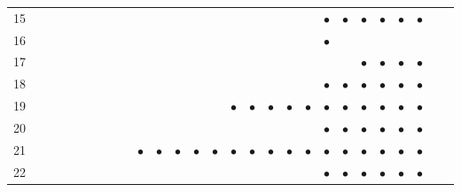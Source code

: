 \documentclass[text.tex]{subfiles}
\begin{document}
\begin{table}
{\begin{tabular}{l|cccccccccccccccccccccccccc}
15  &           &           &           &           &           &           &           &           &           &           &           &           &           &           &           &           &           &           & $\bullet$ & $\bullet$ & $\bullet$ & $\bullet$ & $\bullet$ & $\bullet$ &           \\
16  &           &           &           &           &           &           &           &           &           &           &           &           &           &           &           &           &           &           & $\bullet$ &           &           &           &           &           &           \\
17  &           &           &           &           &           &           &           &           &           &           &           &           &           &           &           &           &           &           &           &           & $\bullet$ & $\bullet$ & $\bullet$ & $\bullet$ &           \\
18  &           &           &           &           &           &           &           &           &           &           &           &           &           &           &           &           &           &           & $\bullet$ & $\bullet$ & $\bullet$ & $\bullet$ & $\bullet$ & $\bullet$ &           \\
19  &           &           &           &           &           &           &           &           &           &           &           &           &           & $\bullet$ & $\bullet$ & $\bullet$ & $\bullet$ & $\bullet$ & $\bullet$ & $\bullet$ & $\bullet$ & $\bullet$ & $\bullet$ & $\bullet$ &           \\
20  &           &           &           &           &           &           &           &           &           &           &           &           &           &           &           &           &           &           & $\bullet$ & $\bullet$ & $\bullet$ & $\bullet$ & $\bullet$ & $\bullet$ &           \\
21  &           &           &           &           &           &           &           &           & $\bullet$ & $\bullet$ & $\bullet$ & $\bullet$ & $\bullet$ & $\bullet$ & $\bullet$ & $\bullet$ & $\bullet$ & $\bullet$ & $\bullet$ & $\bullet$ & $\bullet$ & $\bullet$ & $\bullet$ & $\bullet$ &           \\
22  &           &           &           &           &           &           &           &           &           &           &           &           &           &           &           &           &           &           & $\bullet$ & $\bullet$ & $\bullet$ & $\bullet$ & $\bullet$ & $\bullet$ &           \\

\end{tabular}}
\end{table}
\end{document}
